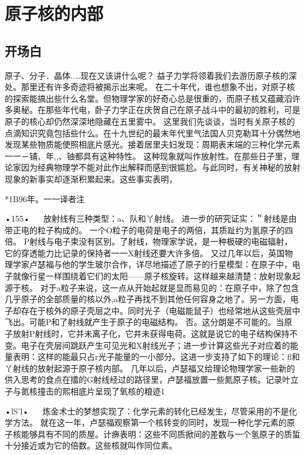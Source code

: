 \chapter{原子核的内部}

\section{开场白}

原子、分子．晶体..…现在又该讲什么呢？
益子力学将领着我们去游历原子核的深处。那里还有许多奇迹将被揭示出来呢。
在二十年代，谁也想象不出，对原子核的探索能搞出些什么名堂。但物理学家的好奇心总是很重的，而原子核又蕴藏滔许多奥秘。在那些年代电，卧子力学正在庆贺自己在原子战斗中的最初的胜利，可是原子的核心却仍然深深地隐藏在五里雾中。
这里我们先谈谈，当时有关原子核的点滴知识究竟包括些什么。在十九世纪的最末年代里气法国人贝克勒耳十分偶然地发现某些物质能使照相底片感光。接着居里夫妇发现：周期表末端的三种化学元素一一－铺、年,,、铀都具有这种特性。
这种现象就叫作放射性。在那些日子里，理论家因为经典物理学不能对此作出解释而感到很尴尬。与此同时，有关神秘的放射现象的新事实却逐渐积累起来。这些事实表明，

*1B96年。一一译者注

•155•
  
放射线有三种类型：a、队和丫射线。
进一步的研究证实：＂射线是由带正电的粒子构成的。
一个O粒子的电荷是电子的两倍，其质趾约为氢原子的四倍。
P射线与电子束没有区别。了射线，物理家学说，是一种极硬的电磁辐射，它的穿透能力比记录的保持者一一X射线还要大许多倍。
又过几年以后，英国物理学家卢瑟福与他的学生玻尔合作，详尽地描述了原子的行星模型：在原子中，电子就像行星一样围绕着它们的太阳——原子核旋转。这样越来越清楚：放射现象起源于核。
对于a粒子来说，这一点从开始起就是显而易见的：在原子中，除了包含几乎原子的全部质量的核以外,a粒子再找不到其他任何容身之地了。另一方面，电子却存在于核外的原子壳层之中。同时光子（电磁能鼠子）也经常地从这些壳层中飞出。可能P和了射线就产生于原子的电磁结构。
否。这分朗是不可能的。当原子放射P射线时，它并未离子化，它井未获得电荷。这就是说它的电子结构保持不变。电子在壳层间跳跃产生可见光和X射线光子；进一步计算这些光子对应着的能量表明：这样的能最只占r光子能量的一小部分。这进一步支持了如下的理论：fl和丫射线的放射起源于原子核内部。
几年以后，卢瑟福又给理论物理学家一些新的供入思考的食点在擂的G射线经过的路径里，卢瑟福放置一些氮原子核。记录叶立子与氮核撞击的熙相底片呈现了氧核的粮迹1

•lS'l•
  
炼金术士的梦想实现了：化学元素的转化已经发生，尽管采用的不是化学方法。
就在这一年，卢瑟福观察第一个核转变的同时，发现一种化学元素的原子核能够具有不同的质屋。计痹表明：这些不同质掀间的差数与一个氢原子的质蜇十分接近或为它的倍数。这些核就叫作同位素。

